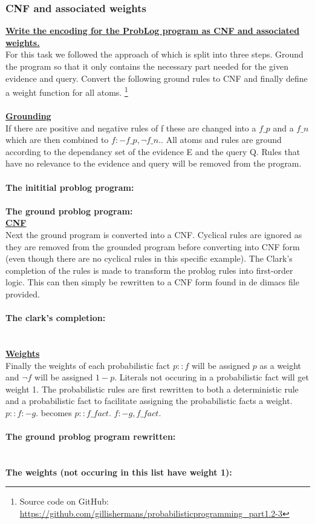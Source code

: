 \documentclass{article}
\begin{document}
\subsubsection{CNF and associated weights}
\underline{\textbf{Write the encoding for the ProbLog program as CNF and associated weights.}}
\\
For this task we followed the approach of \cite{Fierens} which is split into three steps. Ground the program so that it only contains the necessary part needed for the given evidence and query. Convert the following ground rules to CNF and finally define a weight function for all atoms. \footnote{Source code on GitHub: \href{https://github.com/gillishermans/probabilisticprogramming_part1.2-3}{https://github.com/gillishermans/probabilisticprogramming\_part1.2-3}}
\\\\
\underline{\textbf{Grounding}}
\\
If there are positive and negative rules of f these are changed into a $f\_p$ and a $f\_n$ which are then combined to $f :- f\_p,  \neg f\_n.$. All atoms and rules are ground according to the dependancy set of the evidence E and the query Q. Rules that have no relevance to the evidence and query will be removed from the program. 
\\\\
\textbf{The inititial problog program:}
\\

\\
\textbf{The ground problog program:}
\\

\underline{\textbf{CNF}}
\\
Next the ground program is converted into a CNF. Cyclical rules are ignored as they are removed from the grounded program before converting into CNF form (even though there are no cyclical rules in this specific example). The Clark's completion of the rules is made to transform the problog rules into first-order logic. This can then simply be rewritten to a CNF form found in de dimacs file provided.
\\\\
\textbf{The clark's completion:}
\\

\\\\
\underline{\textbf{Weights}}
\\
Finally the weights of each probabilistic fact $p::f$ will be assigned $p$ as a weight and $\neg f$ will be assigned $1-p$. Literals not occuring in a probabilistic fact will get weight 1. The probabilistic rules are first rewritten to both a deterministic rule and a probabilistic fact to facilitate assigning the probabilistic facts a weight. $p :: f :- g.$ becomes $p :: f\_fact.$ $f :- g, f\_fact.$
\\\\
\textbf{The ground problog program rewritten:}
\\

\\\\
\textbf{The weights (not occuring in this list have weight 1):}
\\

\end{document}
